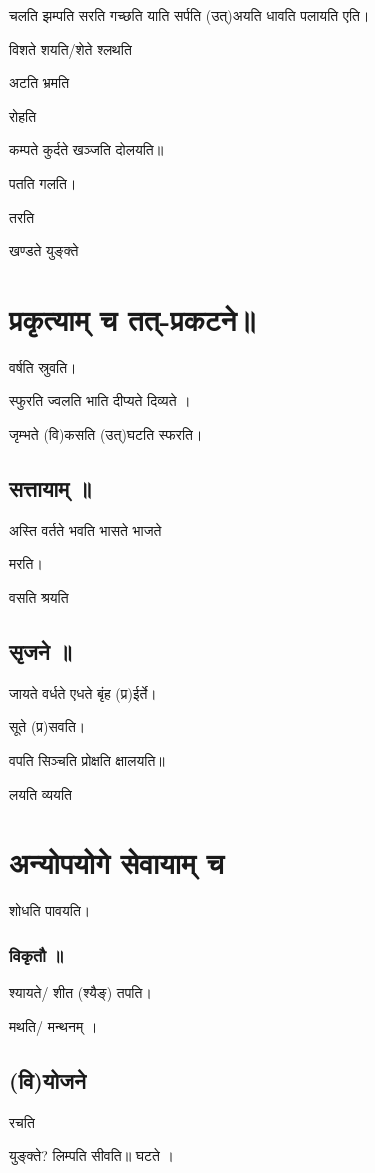 \documentclass[oneside, article]{memoir}
\begin{document}
चलति झम्पति सरति गच्छति याति सर्पति (उत्)अयति धावति पलायति एति।

विशते शयति/शेते श्लथति

अटति भ्रमति 

रोहति

कम्पते कुर्दते खञ्जति दोलयति॥

पतति गलति।

तरति

खण्डते युङ्क्ते

\section{प्रकृत्याम् च तत्-प्रकटने॥}
वर्षति स्रुवति।

स्फुरति ज्वलति भाति दीप्यते दिव्यते ।

जृम्भते (वि)कसति (उत्)घटति स्फरति।

\subsection{सत्तायाम् ॥}
अस्ति वर्तते भवति भासते भाजते

मरति।

वसति श्रयति

\subsection{सृजने ॥}
जायते वर्धते एधते बृंह (प्र)ईर्ते।

सूते (प्र)सवति।

वपति सिञ्चति प्रोक्षति क्षालयति॥

लयति व्ययति

\section{अन्योपयोगे सेवायाम् च}

शोधति पावयति।

\subsubsection{विकृतौ ॥}
श्यायते/ शीत (श्यैङ्) तपति।

मथति/ मन्थनम् ।

\subsection{(वि)योजने}
रचति

युङ्क्ते? लिम्पति सीवति॥ घटते ।
\end{document}
